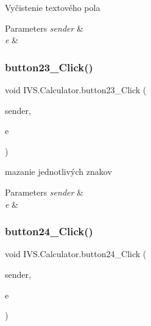 Vyčistenie textového pola 


\begin{DoxyParams}{Parameters}
{\em sender} & \\
\hline
{\em e} & \\
\hline
\end{DoxyParams}
\mbox{\label{class_i_v_s_1_1_calculator_a429d9cfc3bda07afb25f3acdec8894b2}} 
\subsubsection{\texorpdfstring{button23\+\_\+\+Click()}{button23\_Click()}}
{\footnotesize\ttfamily void I\+V\+S.\+Calculator.\+button23\+\_\+\+Click (\begin{DoxyParamCaption}\item[{object}]{sender,  }\item[{Event\+Args}]{e }\end{DoxyParamCaption})\hspace{0.3cm}{\ttfamily [protected]}}



mazanie jednotlivých znakov 


\begin{DoxyParams}{Parameters}
{\em sender} & \\
\hline
{\em e} & \\
\hline
\end{DoxyParams}
\mbox{\label{class_i_v_s_1_1_calculator_a35aa433b5f36197331eecc260dc495f3}} 
\subsubsection{\texorpdfstring{button24\+\_\+\+Click()}{button24\_Click()}}
{\footnotesize\ttfamily void I\+V\+S.\+Calculator.\+button24\+\_\+\+Click (\begin{DoxyParamCaption}\item[{object}]{sender,  }\item[{Event\+Args}]{e }\end{DoxyParamCaption})\hspace{0.3cm}{\ttfamily [protected]}}



